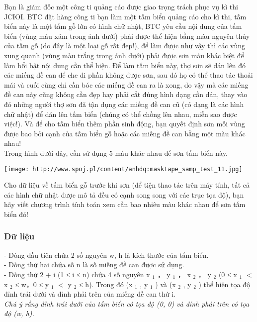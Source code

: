 



   Bạn là giám đốc một công ti quảng cáo được giao trọng trách phục vụ kì thi JCIOI. BTC đặt hàng công ti bạn làm một tấm biển quảng cáo cho kì thi, tấm biển này là một tấm gỗ lớn có hình chữ nhật, BTC yêu cầu nội dung của tấm biển (vùng màu xám trong ảnh dưới) phải được thể hiện bằng màu nguyên thủy của tấm gỗ (do đây là một loại gỗ rất đẹp!), để làm được như vậy thì các vùng xung quanh (vùng màu trắng trong ảnh dưới) phải được sơn màu khác biệt để làm bổi bật nội dung cần thể hiện. Để làm tấm biển này, thợ sơn sẽ dán lên đó các miếng đề can để che đi phần không được sơn, sau đó họ có thể thao tác thoải mái và cuối cùng chỉ cần bóc các miếng đề can ra là xong, do vậy mà các miếng đề can này cũng không cần đẹp hay phải cắt đúng hình dạng cần dán, thay vào đó những người thợ sơn đã tận dụng các miếng đề can cũ (có dạng là các hình chữ nhật) để dán lên tấm biển (chúng có thể chồng lên nhau, miễn sao được việc!). Và để cho tấm biển thêm phần sinh động, bạn quyết định sơn mỗi vùng được bao bởi cạnh của tấm biển gỗ hoặc các miếng đề can bằng một màu khác nhau!   
\\   Trong hình dưới đây, cần sử dụng 5 màu khác nhau để sơn tấm biển này.  


\texttt{[image: http://www.spoj.pl/content/anhdq:masktape\_samp\_test\_11.jpg]}



   Cho dữ liệu về tấm biển gỗ trước khi sơn (để tiện thao tác trên máy tính, tất cả các hình chữ nhật được mô tả đều có cạnh song song với các trục tọa độ), bạn hãy viết chương trình tính toán xem cần bao nhiêu màu khác nhau để sơn tấm biển đó!  

\subsubsection{   Dữ liệu  }

   - Dòng đầu tiên chứa 2 số nguyên w, h là kích thước của tấm biển.   
\\   - Dòng thứ hai chứa số n là số miếng đề can được sử dụng.   
\\   - Dòng thứ 2 + i (1 ≤ i ≤ n) chứa 4 số nguyên x   $_    1   $   ， y   $_    1   $   ， x   $_    2   $   ， y   $_    2   $   (0 ≤ x   $_    1   $   $<$ x   $_    2   $   ≤ w，0 ≤ y   $_    1   $   $<$ y   $_    2   $   ≤ h). Trong đó (x   $_    1   $   , y   $_    1   $   ) và (x   $_    2   $   , y   $_    2   $   ) thể hiện tọa độ đỉnh trái dưới và đỉnh phải trên của miếng đề can thứ i.   
\\\textit{     Chú ý rằng đỉnh trái dưới của tấm biển có tọa độ (0, 0) và đỉnh phải trên có tọa độ (w, h).    }

